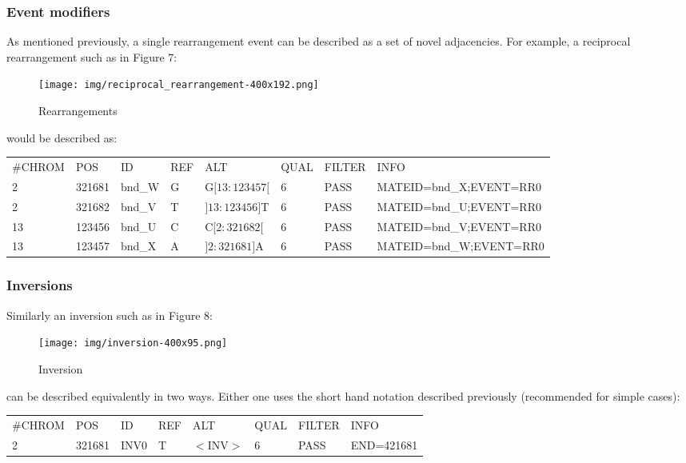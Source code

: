 \documentclass[8pt]{article}
\begin{document}
\subsubsection{Event modifiers}
As mentioned previously, a single rearrangement event can be described as a set of novel adjacencies.
For example, a reciprocal rearrangement such as in Figure 7:

\begin{figure}[ht]
\centering
\texttt{[image: img/reciprocal\_rearrangement-400x192.png]}
\caption{Rearrangements}
\end{figure}

\noindent
would be described as:

\vspace{0.3cm}
\footnotesize
\begin{tabular}{ l l l l l l l l }
\#CHROM & POS & ID & REF & ALT & QUAL & FILTER & INFO \\
2 & 321681 & bnd\_W & G & G$[13:123457[$ & 6 & PASS & MATEID=bnd\_X;EVENT=RR0 \\
2 & 321682 & bnd\_V & T & $]13:123456]$T & 6 & PASS & MATEID=bnd\_U;EVENT=RR0 \\
13 & 123456 & bnd\_U & C & C$[2:321682[$ & 6 & PASS & MATEID=bnd\_V;EVENT=RR0 \\
13 & 123457 & bnd\_X & A & $]2:321681]$A & 6 & PASS & MATEID=bnd\_W;EVENT=RR0 \\
\end{tabular}
\normalsize

\subsubsection{Inversions}
\begin{samepage}
Similarly an inversion such as in Figure 8:

\begin{figure}[ht]
\centering
\texttt{[image: img/inversion-400x95.png]}
\caption{Inversion}
\end{figure}

\noindent
can be described equivalently in two ways.
Either one uses the short hand notation described previously (recommended for simple cases):
\end{samepage}

\vspace{0.3cm}
\small
\begin{tabular}{ l l l l l l l l }
\#CHROM & POS & ID & REF & ALT & QUAL & FILTER & INFO \\
2 & 321681 & INV0 & T & $<$INV$>$ & 6 & PASS & END=421681 \\
\end{tabular}
\normalsize
\vspace{0.3cm}
\end{document}
